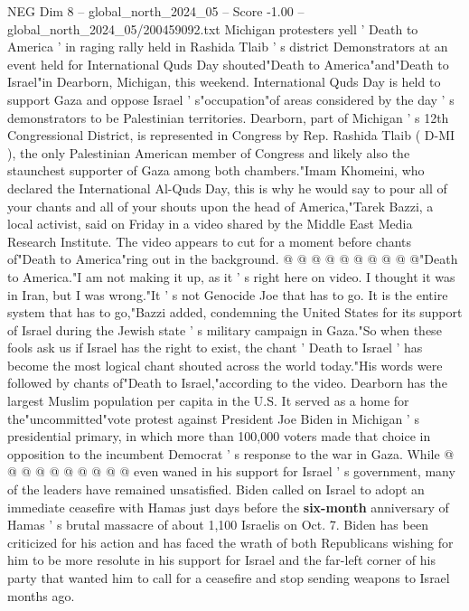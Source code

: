 \begin{textsample}{NEG Dim 8 – global\_north\_2024\_05 – Score -1.00 – global\_north\_2024\_05/200459092.txt}  \label{ex:f8_neg_276}
Michigan protesters yell ' Death to America ' in raging rally held in Rashida Tlaib ' s district Demonstrators at an event held for International Quds Day shouted"Death to America"and"Death to Israel"in Dearborn, Michigan, this weekend.
International Quds Day is held to support Gaza and oppose Israel ' s"occupation"of areas considered by the day ' s demonstrators to be Palestinian territories.
Dearborn, part of Michigan ' s 12th Congressional District, is represented in Congress by Rep.
Rashida Tlaib ( D-MI ), the only Palestinian American member of Congress and likely also the staunchest supporter of Gaza among both chambers."Imam Khomeini, who declared the International Al-Quds Day, this is why he would say to pour all of your chants and all of your shouts upon the head of America,"Tarek Bazzi, a local activist, said on Friday in a video shared by the Middle East Media Research Institute.
The video appears to cut for a moment before chants of"Death to America"ring out in the background. @ @ @ @ @ @ @ @ @ @"Death to America."I am not making it up, as it ' s right here on video.
I thought it was in Iran, but I was wrong."It ' s not Genocide Joe that has to go.
It is the entire system that has to go,"Bazzi added, condemning the United States for its support of Israel during the Jewish state ' s military campaign in Gaza."So when these fools ask us if Israel has the right to exist, the chant ' Death to Israel ' has become the most logical chant shouted across the world today."His words were followed by chants of"Death to Israel,"according to the video.
Dearborn has the largest Muslim population per capita in the U.S.
It served as a home for the"uncommitted"vote protest against President Joe Biden in Michigan ' s presidential primary, in which more than 100,000 voters made that choice in opposition to the incumbent Democrat ' s response to the war in Gaza.
While @ @ @ @ @ @ @ @ @ @ even waned in his support for Israel ' s government, many of the leaders have remained unsatisfied.
Biden called on Israel to adopt an immediate ceasefire with Hamas just days before the \textbf{six-month} anniversary of Hamas ' s brutal massacre of about 1,100 Israelis on Oct. 7.
Biden has been criticized for his action and has faced the wrath of both Republicans wishing for him to be more resolute in his support for Israel and the far-left corner of his party that wanted him to call for a ceasefire and stop sending weapons to Israel months ago.

\end{textsample}
